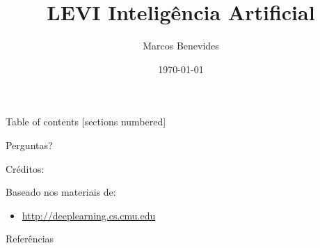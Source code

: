 \documentclass[10pt]{beamer}
\title{LEVI \- Inteligência Artificial}
\date{\today}
\author{Marcos Benevides}
\institute{Universidade Federal do Maranhão}
\theoremstyle{definition}
\begin{document}
\maketitle

\begin{frame}{Table of contents}
  [sections numbered]
  \tableofcontents%
\end{frame}







{
\begin{frame}[standout]
  Perguntas?
\end{frame}
}

\begin{frame}{Créditos:}

  Baseado nos materiais de:
  \begin{itemize}
    \item \href{http://deeplearning.cs.cmu.edu/}{http://deeplearning.cs.cmu.edu}
  \end{itemize}

\end{frame}


\begin{frame}[allowframebreaks]{Referências}

  
  

\end{frame}
\end{document}

